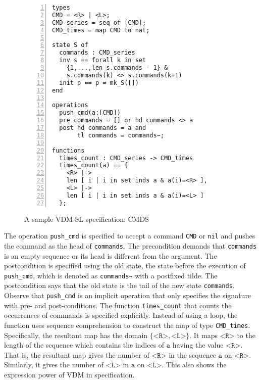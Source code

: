 \begin{figure}[t]
\begin{center}
\begin{mdframed}[roundcorner=5pt]
\begin{Verbatim}[fontsize=\small,numbers=left]
types
CMD = <R> | <L>;
CMD_series = seq of [CMD];
CMD_times = map CMD to nat;

state S of
  commands : CMD_series
  inv s == forall k in set 
    {1,...,len s.commands - 1} &
    s.commands(k) <> s.commands(k+1)
  init p == p = mk_S([])
end

operations
  push_cmd(a:[CMD])
  pre commands = [] or hd commands <> a
  post hd commands = a and
       tl commands = commands~;

functions
  times_count : CMD_series -> CMD_times
  times_count(a) == {
    <R> |->
    len [ i | i in set inds a & a(i)=<R> ],
    <L> |->
    len [ i | i in set inds a & a(i)=<L> ]
  };
\end{Verbatim}
\end{mdframed}
\vspace{-10pt}
\caption{A sample VDM-SL specification: CMDS}
\label{fig:module_sample}
\vspace{-20pt}
\end{center}
\end{figure}

The operation {\tt push\_cmd} is specified to accept a command {\tt CMD} or {\tt nil} and pushes the command as the head of {\tt commands}. The precondition demands that \texttt{commands} is an empty sequence or its head is different from the argument. The postcondition is specified using the old state, the state before the execution of {\tt push\_cmd}, which is denoted as {\tt commands\textasciitilde} with a postfixed tilde. The postcondition says that the old state is the tail of the new state {\tt commands}. Observe that {\tt push\_cmd} is an implicit operation that only specifies the signature with pre- and post-conditions. The function \texttt{times\_count} that counts the occurrences of commands is specified explicitly. Instead of using a loop, the function uses sequence comprehension to construct the map of type {\tt CMD\_times}. Specifically, the resultant map has the domain $\{ \texttt{<R>}, \texttt{<L>} \}$. It maps $\texttt{<R>}$ to the length of the sequence which contains the indices of $\texttt{a}$ having the value $\texttt{<R>}$. That is, the resultant map gives the number of $\texttt{<R>}$ in the sequence $\texttt{a}$ on $\texttt{<R>}$. Similarly, it gives the number of $\texttt{<L>}$ in $\texttt{a}$ on $\texttt{<L>}$. This also shows the expression power of VDM in specification. 

